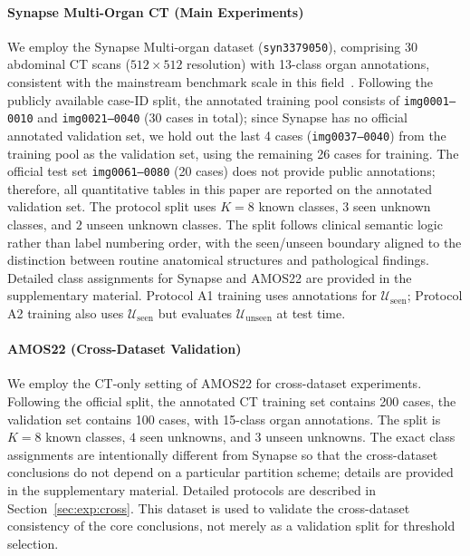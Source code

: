 \documentclass[journal]{IEEEtai}
\newcommand{\cU}{\mathcal{U}}
\begin{document}
\paragraph{Synapse Multi-Organ CT (Main Experiments)}
We employ the Synapse Multi-organ dataset (\texttt{syn3379050}), comprising 30 abdominal
CT scans ($512 \times 512$ resolution) with 13-class organ annotations, consistent with
the mainstream benchmark scale in this field~\cite{chen2021transunet,cao2022swinunet}.
Following the publicly available case-ID split, the annotated training pool consists of
\texttt{img0001--0010} and \texttt{img0021--0040} (30 cases in total); since Synapse
has no official annotated validation set, we hold out the last 4 cases
(\texttt{img0037--0040}) from the training pool as the validation set, using the
remaining 26 cases for training.
The official test set \texttt{img0061--0080} (20 cases) does not provide public
annotations; therefore, all quantitative tables in this paper are reported on the
annotated validation set.
The protocol split uses $K{=}8$ known classes, $3$ seen unknown classes, and $2$
unseen unknown classes.
The split follows clinical semantic logic rather than label numbering order, with the
seen/unseen boundary aligned to the distinction between routine anatomical structures
and pathological findings.
Detailed class assignments for Synapse and AMOS22 are provided in the supplementary
material.
Protocol A1 training uses annotations for $\cU_{\text{seen}}$; Protocol A2 training
also uses $\cU_{\text{seen}}$ but evaluates $\cU_{\text{unseen}}$ at test time.

\paragraph{AMOS22 (Cross-Dataset Validation)}
We employ the CT-only setting of AMOS22 for cross-dataset experiments.
Following the official split, the annotated CT training set contains 200 cases,
the validation set contains 100 cases, with 15-class organ annotations.
The split is $K{=}8$ known classes, $4$ seen unknowns, and $3$ unseen unknowns.
The exact class assignments are intentionally different from Synapse so that the
cross-dataset conclusions do not depend on a particular partition scheme; details are
provided in the supplementary material.
Detailed protocols are described in Section~\ref{sec:exp:cross}.
This dataset is used to validate the cross-dataset consistency of the core conclusions,
not merely as a validation split for threshold selection.
\end{document}
